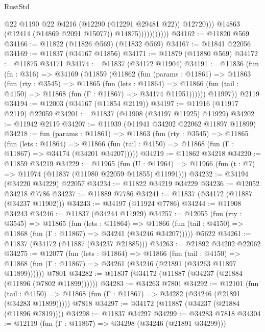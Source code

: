 \begin{lexlean}{RustStd}
\begin{coremodule}
{\begin{coremodule}
{{{{{{{{{{{{{{{{{{{{{{{{{{{{{{{{{{{{{{{{{{{{{{{{{{                                @22
                                @1190
                                @22
                                @4216
                                (@12290 (@12291 @29481 @22))
                                @12720)))
                          @14863
                          (@12414 (@14869 @2091 @15077))
                          @14875)))))))))))
@34162 := @11820 @569
@34166 := @11822 (@11826 @569) (@11832 @569)
@34167 := @11841 @22056
@34169 := @11837 (@34167 @11856)
@34171 := @11879 (@11880 @569)
@34172 := @11875 @34171
@34174 := @11837 (@34172 @11904)
@34191 := @11836
    (fun (fn : @316) =>
    @34169
      (@11859
        (@11862
          (fun (params : @11861) =>
          @11863
            (fun (rty : @3545) =>
            @11865
              (fun (lets : @11864) =>
              @11866 (fun (tail : @4150) => @11868 (fun (Γ : @11867) => @34174 @11951))))))
        @11997))
    @2119
@34194 := @12003 (@34167 (@11854 @2119))
@34197 := @11916 (@11917 @2119) @22059
@34201 := @11837 (@11908 (@34197 @11925) @11929)
@34202 := @11942 @2119
@34207 := @11939 (@11941 @34202 @22062 @11897 @11899)
@34218 := fun (params : @11861) =>
  @11863
    (fun (rty : @3545) =>
    @11865
      (fun (lets : @11864) =>
      @11866 (fun (tail : @4150) => @11868 (fun (Γ : @11867) => @34174 (@34201 @34207)))))
@34219 := @11862 @34218
@34220 := @11859 @34219
@34229 := @11965
    (fun (U : @11964) => @11966 (fun (t : @7) => @11974 (@11837 (@11980 @22059 @11855) @11991)))
@34232 := @34194 (@34220 @34229) @22057
@34234 := @11822 @34219 @34229
@34236 := @12052 @34218 @7786
@34237 := @11889 @7786
@34241 := @11837 (@34172 (@11887 (@34237 @11902)))
@34243 := @34197 (@11924 @7786)
@34244 := @11908 @34243
@34246 := @11837 (@34244 @11929)
@34257 := @12055
    (fun (rty : @3545) =>
    @11865
      (fun (lets : @11864) =>
      @11866 (fun (tail : @4150) => @11868 (fun (Γ : @11867) => @34241 (@34246 @34207)))))
    @5622
@34261 := @11837 (@34172 (@11887 (@34237 @21885)))
@34263 := @21892 @34202 @22062
@34275 := @12077
    (fun (lets : @11864) =>
    @11866
      (fun (tail : @4150) =>
      @11868 (fun (Γ : @11867) => @34261 (@34246 (@21891 (@34263 @11897 @11899))))))
    @7801
@34282 := @11837 (@34172 (@11887 (@34237 (@21884 (@11896 (@7802 @11899))))))
@34283 := @34263 @7801
@34292 := @12101
    (fun (tail : @4150) => @11868 (fun (Γ : @11867) => @34282 (@34246 (@21891 (@34283 @11899)))))
    @7818
@34297 := @34172 (@11887 (@34237 (@21884 (@11896 @7819))))
@34298 := @11837 @34297
@34299 := @34283 @7818
@34304 := @12119 (fun (Γ : @11867) => @34298 (@34246 (@21891 @34299)))
}}}}}}}}}}}}}}}}}}}}}}}}}}}}}}}}}}}}}}}}}}}}}}}}}}
\end{coremodule}}
\end{coremodule}
\end{lexlean}
